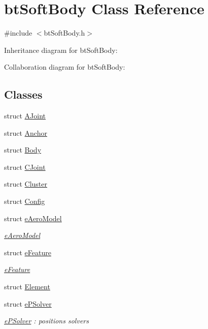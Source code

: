 \hypertarget{classbt_soft_body}{\section{bt\+Soft\+Body Class Reference}
\label{classbt_soft_body}
}


{\ttfamily \#include $<$bt\+Soft\+Body.\+h$>$}



Inheritance diagram for bt\+Soft\+Body\+:


Collaboration diagram for bt\+Soft\+Body\+:
\subsection*{Classes}
\begin{DoxyCompactItemize}
\item 
struct \hyperlink{structbt_soft_body_1_1_a_joint}{A\+Joint}
\item 
struct \hyperlink{structbt_soft_body_1_1_anchor}{Anchor}
\item 
struct \hyperlink{structbt_soft_body_1_1_body}{Body}
\item 
struct \hyperlink{structbt_soft_body_1_1_c_joint}{C\+Joint}
\item 
struct \hyperlink{structbt_soft_body_1_1_cluster}{Cluster}
\item 
struct \hyperlink{structbt_soft_body_1_1_config}{Config}
\item 
struct \hyperlink{structbt_soft_body_1_1e_aero_model}{e\+Aero\+Model}
\begin{DoxyCompactList}\small\item\em \hyperlink{structbt_soft_body_1_1e_aero_model}{e\+Aero\+Model} \end{DoxyCompactList}\item 
struct \hyperlink{structbt_soft_body_1_1e_feature}{e\+Feature}
\begin{DoxyCompactList}\small\item\em \hyperlink{structbt_soft_body_1_1e_feature}{e\+Feature} \end{DoxyCompactList}\item 
struct \hyperlink{structbt_soft_body_1_1_element}{Element}
\item 
struct \hyperlink{structbt_soft_body_1_1e_p_solver}{e\+P\+Solver}
\begin{DoxyCompactList}\small\item\em \hyperlink{structbt_soft_body_1_1e_p_solver}{e\+P\+Solver} \+: positions solvers \end{DoxyCompactList}\item 

\end{DoxyCompactItemize}
